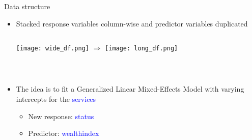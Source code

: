 \documentclass{beamer}
\begin{document}
\begin{frame}{Data structure}

\begin{itemize}[<+->]
\item Stacked response variables column-wise and predictor variables duplicated
\vspace{0.5cm}
\begin{columns}[t]
\texttt{[image: wide\_df.png]}
\pause
{}
$\Longrightarrow$
\pause
{}
\texttt{[image: long\_df.png]}
\end{columns}\\

\item The idea is to fit a Generalized Linear Mixed-Effects Model with varying intercepts for the \textcolor{blue}{services}

\begin{itemize}[<+->]
\item New response: \textcolor{blue}{status}
\item Predictor: \textcolor{blue}{wealthindex}
\end{itemize}

\end{itemize}

\end{frame}
\end{document}

